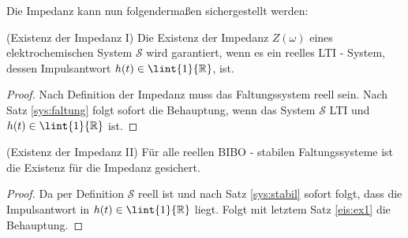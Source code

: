 Die Impedanz kann nun folgendermaßen sichergestellt werden:
                                                                                                                                                                                                                                                                                                            \begin{satz}\label{eis:ex1}(Existenz der Impedanz I)                                                                                                                                                    Die Existenz der Impedanz $Z(\omega)$ eines elektrochemischen System $\mathscr{S}$ wird garantiert, wenn es ein reelles LTI - System, dessen Impulsantwort $h(t) \in \lint{1}{\mathbb{R}}$, ist.                                                                                                                                                                                                                                                                                                              \begin{proof}                                                                                                                                                       Nach Definition der Impedanz muss das Faltungssystem reell sein. Nach Satz \ref{sys:faltung} folgt sofort die Behauptung, wenn das System $\mathscr{S}$ LTI und $h(t) \in \lint{1}{\mathbb{R}}$ ist.                                                                                                                                                \end{proof}                                                                                                                                                                                                                                                                                                            \end{satz}
                                                                                                                                                                                                                                                                                                           \begin{satz}\label{eis:ex2}(Existenz der Impedanz II)
                                                                                                                                                    Für alle reellen BIBO - stabilen Faltungssysteme ist die Existenz für die Impedanz gesichert.                                                                                                                                                       \begin{proof}
Da per Definition $\mathscr{S}$ reell ist und nach Satz \ref{sys:stabil} sofort folgt, dass die Impulsantwort in $h(t) \in \lint{1}{\mathbb{R}}$ liegt. Folgt mit letztem Satz \ref{eis:ex1}  die Behauptung.
\end{proof}                                                                                                                                                     \end{satz}

